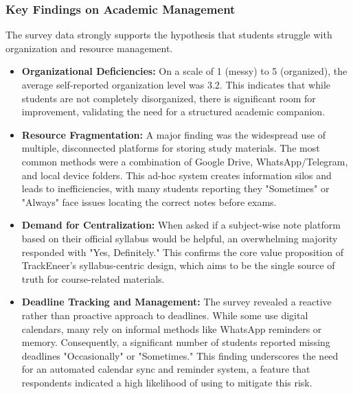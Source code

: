 \documentclass[conference]{IEEEtran}
\begin{document}
\subsubsection{Key Findings on Academic Management}
The survey data strongly supports the hypothesis that students struggle with organization and resource management.
\begin{itemize}
    \item \textbf{Organizational Deficiencies:} On a scale of 1 (messy) to 5 (organized), the average self-reported organization level was 3.2. This indicates that while students are not completely disorganized, there is significant room for improvement, validating the need for a structured academic companion.
    \item \textbf{Resource Fragmentation:} A major finding was the widespread use of multiple, disconnected platforms for storing study materials. The most common methods were a combination of Google Drive, WhatsApp/Telegram, and local device folders. This ad-hoc system creates information silos and leads to inefficiencies, with many students reporting they "Sometimes" or "Always" face issues locating the correct notes before exams.
    \item \textbf{Demand for Centralization:} When asked if a subject-wise note platform based on their official syllabus would be helpful, an overwhelming majority responded with "Yes, Definitely." This confirms the core value proposition of TrackEneer's syllabus-centric design, which aims to be the single source of truth for course-related materials.
    \item \textbf{Deadline Tracking and Management:} The survey revealed a reactive rather than proactive approach to deadlines. While some use digital calendars, many rely on informal methods like WhatsApp reminders or memory. Consequently, a significant number of students reported missing deadlines "Occasionally" or "Sometimes." This finding underscores the need for an automated calendar sync and reminder system, a feature that respondents indicated a high likelihood of using to mitigate this risk.
\end{itemize}
\end{document}
